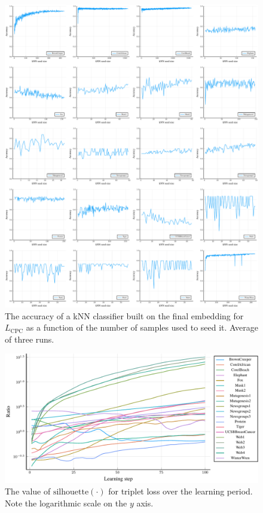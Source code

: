 \begin{figure}
  \centering
  \includegraphics[width=\textwidth]{images/CPC-toy/kNN/CPC-toy-kNN.pdf}
  \caption{The accuracy of a kNN classifier built on the final embedding for \( L_\mathrm{CPC} \) as a function of the number of samples used to seed it. Average of three runs.}\label{fig:CPC-toy-kNN}
\end{figure}

\begin{figure}
  \centering
  \includegraphics[width=\textwidth]{images/triplet-toy/ratio/triplet-toy-ratio.pdf}
  \caption{The value of \( \mathrm{silhouette} \left( \cdot \right) \) for triplet loss over the learning period. Note the logarithmic scale on the \( y \) axis.}\label{fig:triplet-toy-ratio}
\end{figure}

